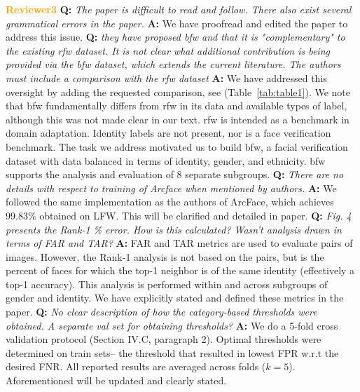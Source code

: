 \documentclass[10pt,twocolumn,letterpaper]{article}
\begin{document}
\noindent\textbf{\textcolor{orange}{Reviewer3}}
\textbf{Q:} \textit{The paper is difficult to read and follow. There also exist several grammatical errors in the paper.} 
\textbf{A:} We have proofread and edited the paper to address this issue.
\textbf{Q:} \textit{they have proposed \gls{bfw} and that it is "complementary" to the existing \gls{rfw} dataset. It is not clear what additional contribution is being provided via the \gls{bfw} dataset, which extends the current literature. The authors must include a comparison with the \gls{rfw} dataset}
\textbf{A:} We have addressed this oversight by adding the requested comparison, see (Table~\ref{tab:table1}). We note that \gls{bfw} fundamentally differs from \gls{rfw} in its data and available types of label, although this was not made clear in our text. \gls{rfw} is intended as a benchmark in domain adaptation. Identity labels are not present, nor is a face verification benchmark. The task we address motivated us to build \gls{bfw}, a facial verification dataset with data balanced in terms of identity, gender, and ethnicity. \gls{bfw} supports the analysis and evaluation of 8 separate subgroups.
\textbf{Q:} \textit{There are no details with respect to training of Arcface when mentioned by authors.} 
\textbf{A:} We followed the same implementation as the authors of ArcFace, which achieves 99.83\% obtained on LFW. This will be clarified and detailed in paper.
\textbf{Q:} \textit{Fig. 4 presents the Rank-1 \% error. How is this calculated? Wasn't analysis drawn in terms of FAR and TAR?}  
\textbf{A:} FAR and TAR metrics are used to evaluate pairs of images. However, the Rank-1 analysis is not based on the pairs, but is the percent of faces for which the top-1 neighbor is of the same identity (effectively a top-1 accuracy). This analysis is performed within and across subgroups of gender and identity. We have explicitly stated and defined these metrics in the paper. 
\textbf{Q:} \textit{No clear description of how the category-based thresholds were obtained. A separate val set for obtaining thresholds?} 
\textbf{A:} We do a 5-fold cross validation protocol (Section IV.C, paragraph 2). Optimal thresholds were determined on train sets-- the threshold that resulted in lowest FPR w.r.t the desired FNR. All reported results are averaged across folds ($k=5$). Aforementioned will be updated and clearly stated.
    




{\footnotesize


}
\end{document}
